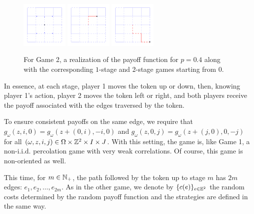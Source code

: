         \begin{figure}[H]
            \centering
            \includegraphics[width = 0.2\textwidth]{./images/game2/L5grid_arrowsit0p040.png}    
            \includegraphics[width = 0.2\textwidth]{./images/game2/Ll1opit1p040.png}            
            \includegraphics[width = 0.2\textwidth]{./images/game2/Ll2opit2p040.png}
            \caption{For Game 2, a realization of the payoff function for $p = 0.4$ along with the corresponding $1$-stage and 2-stage games starting from 0.}
        \end{figure}

        In essence, at each stage, player 1 moves the token up or down, then, knowing player 1's action, player 2 moves the token left or right, and both players receive the payoff associated with the edges traversed by the token.

        To ensure consistent payoffs on the same edge, we require that $g_{\omega}(z, i, 0) = g_{\omega}(z + (0, i), -i, 0)$ and $g_{\omega}(z, 0, j) = g_{\omega}(z + (j, 0), 0, -j)$ for all $(\omega, z, i, j) \in \Omega \times \mathbb{Z}^2 \times I \times J$. With this setting, the game is, like Game 1, a non-i.i.d. percolation game with very weak correlations. Of course, this game is non-oriented as well. 

        This time, for $m \in \mathbb{N}_+$, the path followed by the token up to stage $m$ has $2m$ edges:  $e_1, e_2, \ldots, e_{2m}$. As in the other game, we denote by $\{c(e)\}_{e \in \mathbb{E}^2}$ the random costs determined by the random payoff function and the strategies are defined in the same way. 

